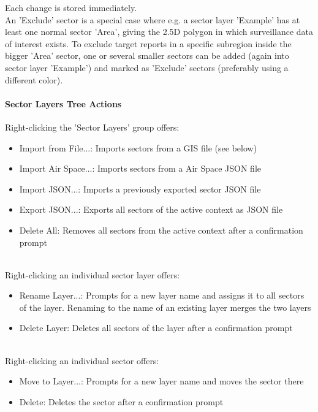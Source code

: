 Each change is stored immediately. \\

An 'Exclude' sector is a special case where e.g. a sector layer 'Example' has at least one normal sector 'Area', giving the 2.5D polygon in which surveillance data of interest exists. To exclude target reports in a specific subregion inside the bigger 'Area' sector, one or several smaller sectors can be added (again into sector layer 'Example') and marked as 'Exclude' sectors (preferably using a different color). \\

\paragraph{Sector Layers Tree Actions}

Right-clicking the 'Sector Layers' group offers:

\begin{itemize}
\item Import from File...: Imports sectors from a GIS file (see below)
\item Import Air Space...: Imports sectors from a Air Space JSON file
\item Import JSON...: Imports a previously exported sector JSON file
\item Export JSON...: Exports all sectors of the active context as JSON file
\item Delete All: Removes all sectors from the active context after a confirmation prompt
\end{itemize}
\ \\

Right-clicking an individual sector layer offers:
\begin{itemize}
\item Rename Layer...: Prompts for a new layer name and assigns it to all sectors of the layer. Renaming to the name of an existing layer merges the two layers
\item Delete Layer: Deletes all sectors of the layer after a confirmation prompt
\end{itemize}
\ \\

Right-clicking an individual sector offers:
\begin{itemize}
\item Move to Layer...: Prompts for a new layer name and moves the sector there
\item Delete: Deletes the sector after a confirmation prompt
\end{itemize}
\ \\


